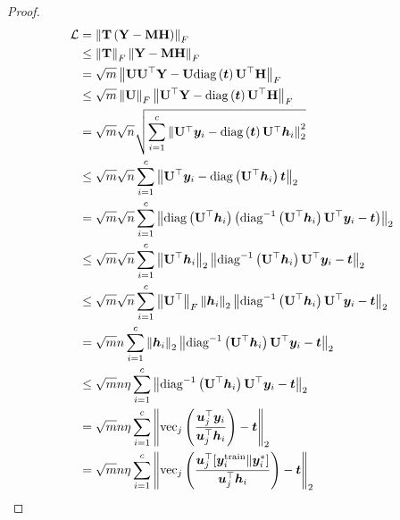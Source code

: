 \documentclass{article} %
\begin{document}
\begin{proof}
	\begin{equation}
		\begin{aligned}
			{\mathcal{L}}&=\left\|{\mathbf{T}}\left({\mathbf{Y}}-{\mathbf{M}}{\mathbf{H}}\right)\right\|_F\\
			&\leq\left\|{\mathbf{T}}\right\|_F\left\|{\mathbf{Y}}-{\mathbf{M}}{\mathbf{H}}\right\|_F\\
			&=\sqrt{m}\left\|{\mathbf{U}}{\mathbf{U}}^{\top}{\mathbf{Y}}-{\mathbf{U}}\mathrm{diag}\left({\bm{t}}\right){\mathbf{U}}^{\top}{\mathbf{H}}\right\|_F\\
			&\leq\sqrt{m}\left\|{\mathbf{U}}\right\|_F\left\|{\mathbf{U}}^{\top}{\mathbf{Y}}-\mathrm{diag}\left({\bm{t}}\right){\mathbf{U}}^{\top}{\mathbf{H}}\right\|_F\\
			&=\sqrt{m}\sqrt{n}\sqrt{\sum_{i=1}^c\left\|{\mathbf{U}}^{\top}{\bm{y}}_i-\mathrm{diag}\left({\bm{t}}\right){\mathbf{U}}^{\top}{\bm{h}}_i\right\|^2_2}\\
			&\leq\sqrt{m}\sqrt{n}\sum_{i=1}^c\left\|{\mathbf{U}}^{\top}{\bm{y}}_i-\mathrm{diag}\left({\mathbf{U}}^{\top}{\bm{h}}_i\right){\bm{t}}\right\|_2\\
			&=\sqrt{m}\sqrt{n}\sum_{i=1}^c\left\|\mathrm{diag}\left({\mathbf{U}}^{\top}{\bm{h}}_i\right)\left(\mathrm{diag}^{-1}\left({\mathbf{U}}^{\top}{\bm{h}}_i\right){\mathbf{U}}^{\top}{\bm{y}}_i-{\bm{t}}\right)\right\|_2\\
			&\leq\sqrt{m}\sqrt{n}\sum_{i=1}^c\left\|{\mathbf{U}}^{\top}{\bm{h}}_i\right\|_2\left\|\mathrm{diag}^{-1}\left({\mathbf{U}}^{\top}{\bm{h}}_i\right){\mathbf{U}}^{\top}{\bm{y}}_i-{\bm{t}}\right\|_2\\
			&\leq\sqrt{m}\sqrt{n}\sum_{i=1}^c\left\|{\mathbf{U}}^{\top}\right\|_F\left\|{\bm{h}}_i\right\|_2\left\|\mathrm{diag}^{-1}\left({\mathbf{U}}^{\top}{\bm{h}}_i\right){\mathbf{U}}^{\top}{\bm{y}}_i-{\bm{t}}\right\|_2\\
			&=\sqrt{m}n\sum_{i=1}^c\left\|{\bm{h}}_i\right\|_2\left\|\mathrm{diag}^{-1}\left({\mathbf{U}}^{\top}{\bm{h}}_i\right){\mathbf{U}}^{\top}{\bm{y}}_i-{\bm{t}}\right\|_2\\
			&\leq\sqrt{m}n\eta\sum_{i=1}^c\left\|\mathrm{diag}^{-1}\left({\mathbf{U}}^{\top}{\bm{h}}_i\right){\mathbf{U}}^{\top}{\bm{y}}_i-{\bm{t}}\right\|_2\\
			&=\sqrt{m}n\eta\sum_{i=1}^c\left\|\mathrm{vec}_j\left(\frac{{\bm{u}}_j^{\top}{\bm{y}}_i}{{\bm{u}}_j^{\top}{\bm{h}}_i}\right)-{\bm{t}}\right\|_2\\
			&=\sqrt{m}n\eta\sum_{i=1}^c\left\|\mathrm{vec}_j\left(\frac{{\bm{u}}_j^{\top}[{\bm{y}}^{\textrm{train}}_i\|{\bm{y}}^*_i]}{{\bm{u}}_j^{\top}{\bm{h}}_i}\right)-{\bm{t}}\right\|_2
		\end{aligned}
	\end{equation}
\end{proof}
\end{document}
